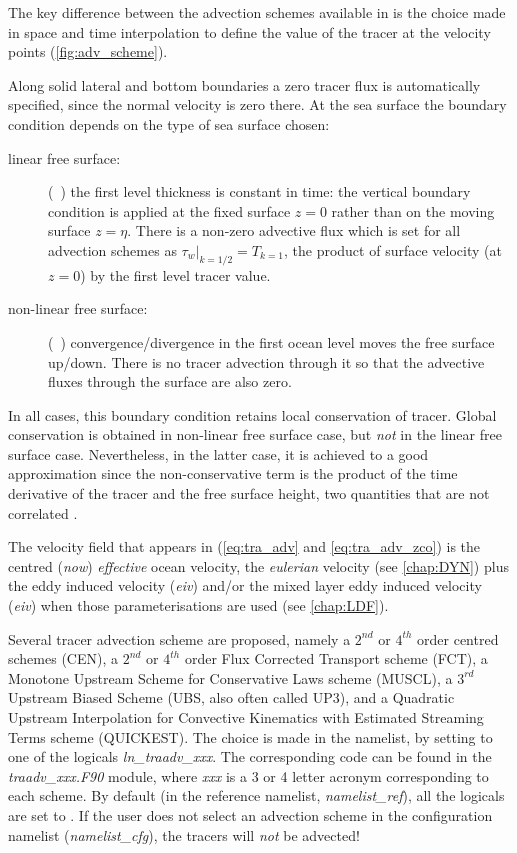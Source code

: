 \documentclass[../main/NEMO_manual]{subfiles}
\begin{document}
The key difference between the advection schemes available in \NEMO is the choice made in space and
time interpolation to define the value of the tracer at the velocity points
(\autoref{fig:adv_scheme}).

Along solid lateral and bottom boundaries a zero tracer flux is automatically specified,
since the normal velocity is zero there.
At the sea surface the boundary condition depends on the type of sea surface chosen:

\begin{description}
\item[linear free surface:]
  (~)
  the first level thickness is constant in time:
  the vertical boundary condition is applied at the fixed surface $z = 0$ rather than on
  the moving surface $z = \eta$.
  There is a non-zero advective flux which is set for all advection schemes as
  $\tau_w|_{k = 1/2} = T_{k = 1}$, \ie the product of surface velocity (at $z = 0$) by
  the first level tracer value.
\item[non-linear free surface:]
  (~)
  convergence/divergence in the first ocean level moves the free surface up/down.
  There is no tracer advection through it so that the advective fluxes through the surface are also zero.
\end{description}

In all cases, this boundary condition retains local conservation of tracer.
Global conservation is obtained in non-linear free surface case, but \textit{not} in the linear free surface case.
Nevertheless, in the latter case, it is achieved to a good approximation since
the non-conservative term is the product of the time derivative of the tracer and the free surface height,
two quantities that are not correlated \citep{Roullet_Madec_JGR00, Griffies_al_MWR01, Campin2004}.

The velocity field that appears in (\autoref{eq:tra_adv} and \autoref{eq:tra_adv_zco}) is
the centred (\textit{now}) \textit{effective} ocean velocity, \ie the \textit{eulerian} velocity
(see \autoref{chap:DYN}) plus the eddy induced velocity (\textit{eiv}) and/or
the mixed layer eddy induced velocity (\textit{eiv}) when those parameterisations are used
(see \autoref{chap:LDF}).

Several tracer advection scheme are proposed, namely a $2^{nd}$ or $4^{th}$ order centred schemes (CEN),
a $2^{nd}$ or $4^{th}$ order Flux Corrected Transport scheme (FCT), a Monotone Upstream Scheme for
Conservative Laws scheme (MUSCL), a $3^{rd}$ Upstream Biased Scheme (UBS, also often called UP3),
and a Quadratic Upstream Interpolation for Convective Kinematics with Estimated Streaming Terms scheme (QUICKEST).
The choice is made in the  namelist, by setting to  one of
the logicals \textit{ln\_traadv\_xxx}.
The corresponding code can be found in the \textit{traadv\_xxx.F90} module, where
\textit{xxx} is a 3 or 4 letter acronym corresponding to each scheme.
By default (\ie in the reference namelist, \textit{namelist\_ref}), all the logicals are set to .
If the user does not select an advection scheme in the configuration namelist (\textit{namelist\_cfg}),
the tracers will \textit{not} be advected!
\end{document}
